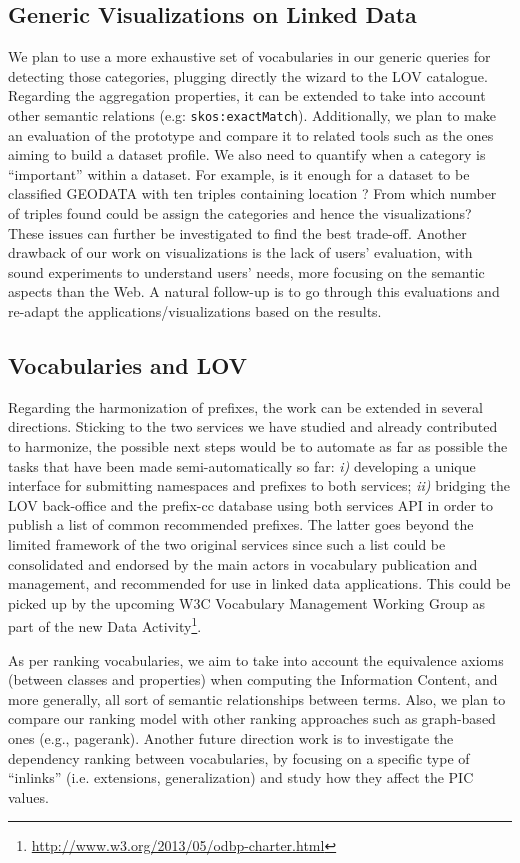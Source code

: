 \subsection{Generic Visualizations on Linked Data}
We plan to use a more exhaustive set of vocabularies in our generic queries for detecting those categories, plugging directly the wizard to the LOV catalogue. Regarding the aggregation properties, it can be extended to take into account other semantic relations (e.g: \texttt{skos:exactMatch}). Additionally, we plan to make an evaluation of the prototype and compare it to related tools such as the ones aiming to build a dataset profile. We also need to quantify when a category is ``important'' within a dataset. For example, is it enough for a dataset to be classified GEODATA with ten triples containing location ? From which number of triples found could be assign the categories and hence the visualizations? These issues can further be investigated to find the best trade-off.  Another drawback of our work on visualizations is the lack of users' evaluation, with sound experiments to understand users' needs, more focusing on the semantic aspects than the Web. A natural follow-up is to go through this evaluations and re-adapt the applications/visualizations based on the results. 
 
\subsection{Vocabularies and LOV}
\label{sec:nextSteps}
Regarding the harmonization of prefixes, the work can be extended in several directions. Sticking to the two services we have studied and already contributed to harmonize, the possible next steps would be to automate as far as possible the tasks that have been made semi-automatically so far: \emph{i)} developing a unique interface for submitting namespaces and prefixes to both services; \emph{ii)} bridging the LOV back-office and the prefix-cc database using both services API in order to publish a list of common recommended prefixes. The latter goes beyond the limited framework of the two original services since such a list could be consolidated and endorsed by the main actors in vocabulary publication and management, and recommended for use in linked data applications. This could be picked up by the upcoming W3C Vocabulary Management Working Group as part of the new Data Activity\footnote{\url{http://www.w3.org/2013/05/odbp-charter.html}}.

 As per ranking vocabularies, we aim to take into account the equivalence axioms (between classes and properties) when computing the Information Content, and more generally, all sort of semantic relationships between terms. Also, we plan to compare our ranking model with other ranking approaches such as graph-based ones (e.g., pagerank). Another future direction work is to investigate the dependency ranking between vocabularies, by focusing on a specific type of ``inlinks'' (i.e. extensions, generalization) and study how they affect the PIC values.


